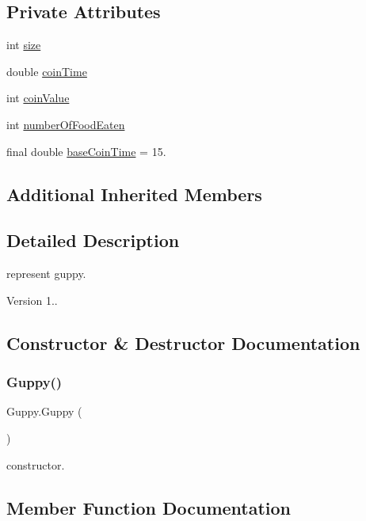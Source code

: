 \subsection*{Private Attributes}
\begin{DoxyCompactItemize}
\item 
int \mbox{\hyperlink{class_guppy_a2424f5424eb13aab67ee61d0876aaf25}{size}}
\item 
double \mbox{\hyperlink{class_guppy_a897004763fd0148c120166ff51650a74}{coin\+Time}}
\item 
int \mbox{\hyperlink{class_guppy_aa88181b53a81e582657fce01c32090e1}{coin\+Value}}
\item 
int \mbox{\hyperlink{class_guppy_a6a7badd3d1d55d0b02f74be82bccba59}{number\+Of\+Food\+Eaten}}
\item 
final double \mbox{\hyperlink{class_guppy_a7f87fda9dabab833cb7223c32d6d86e2}{base\+Coin\+Time}} = 15.
\end{DoxyCompactItemize}
\subsection*{Additional Inherited Members}


\subsection{Detailed Description}
represent guppy. \begin{DoxyVersion}{Version}
1.. 
\end{DoxyVersion}


\subsection{Constructor \& Destructor Documentation}
\mbox{\label{class_guppy_a6336822c9cc2106fad2aaa2e54d159ac}} 
\subsubsection{\texorpdfstring{Guppy()}{Guppy()}}
{\footnotesize\ttfamily Guppy.\+Guppy (\begin{DoxyParamCaption}{ }\end{DoxyParamCaption})\hspace{0.3cm}{\ttfamily [inline]}}

constructor. 

\subsection{Member Function Documentation}
\mbox{\label{class_guppy_ad04fab448adc11ff3eecf3a76c64781b}} 
